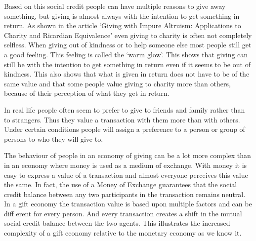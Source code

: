 \documentclass[twoside,openright]{uva-bachelor-thesis}
\begin{document}
Based on this social credit people can have multiple reasons to give away something, but giving is almost always with the intention to get something in return. As shown in the article ‘Giving with Impure Altruism: Applications to Charity and Ricardian Equivalence’\cite{andreoni1989giving} even giving to charity is often not completely selfless. When giving out of kindness or to help someone else most people still get a good feeling. This feeling is called the ‘warm glow’\cite{andreoni1989giving}. This shows that giving can still be with the intention to get something in return even if it seems to be out of kindness. This also shows that what is given in return does not have to be of the same value and that some people value giving to charity more than others, because of their perception of what they get in return.

In real life people often seem to prefer to give to friends and family rather than to strangers. Thus they value a transaction with them more than with others. Under certain conditions people will assign a preference to a person or group of persons to who they will give to.

The behaviour of people in an economy of giving can be a lot more complex than in an economy where money is used as a medium of exchange. With money it is easy to express a value of a transaction and almost everyone perceives this value the same. In fact, the use of a Money of Exchange\cite{weijland2014mathematical} guarantees that the social credit balance between any two participants in the transaction remains neutral. In a gift economy the transaction value is based upon multiple factors and can be diff erent for every person. And every transaction creates a shift in the mutual social credit balance between the two agents. This illustrates the increased complexity of a gift economy relative to the monetary economy as we know it.
\end{document}
